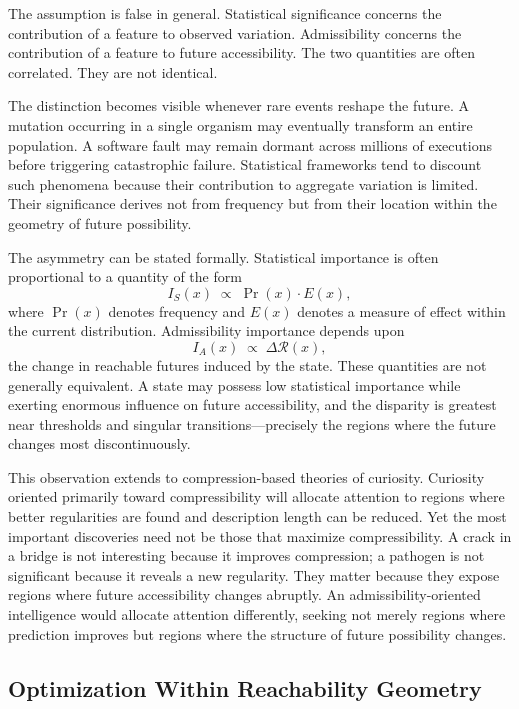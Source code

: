 \documentclass[12pt,a4paper]{article}
\theoremstyle{plain}
\theoremstyle{definition}
\theoremstyle{remark}
\begin{document}
The assumption is false in general. Statistical significance concerns the
contribution of a feature to observed variation. Admissibility concerns the
contribution of a feature to future accessibility. The two quantities are
often correlated. They are not identical.

The distinction becomes visible whenever rare events reshape the future. A
mutation occurring in a single organism may eventually transform an entire
population. A software fault may remain dormant across millions of executions
before triggering catastrophic failure. Statistical frameworks tend to
discount such phenomena because their contribution to aggregate variation is
limited. Their significance derives not from frequency but from their location
within the geometry of future possibility.

The asymmetry can be stated formally. Statistical importance is often
proportional to a quantity of the form
\[
  I_S(x) \;\propto\; \Pr(x) \cdot E(x),
\]
where $\Pr(x)$ denotes frequency and $E(x)$ denotes a measure of effect
within the current distribution. Admissibility importance depends upon
\[
  I_A(x) \;\propto\; \Delta \mathcal{R}(x),
\]
the change in reachable futures induced by the state. These quantities are
not generally equivalent. A state may possess low statistical importance
while exerting enormous influence on future accessibility, and the disparity
is greatest near thresholds and singular transitions---precisely the regions
where the future changes most discontinuously.

This observation extends to compression-based theories of curiosity.
Curiosity oriented primarily toward compressibility will allocate attention
to regions where better regularities are found and description length can be
reduced. Yet the most important discoveries need not be those that maximize
compressibility. A crack in a bridge is not interesting because it improves
compression; a pathogen is not significant because it reveals a new
regularity. They matter because they expose regions where future
accessibility changes abruptly. An admissibility-oriented intelligence would
allocate attention differently, seeking not merely regions where prediction
improves but regions where the structure of future possibility changes.

\subsection{Optimization Within Reachability Geometry}
\end{document}
